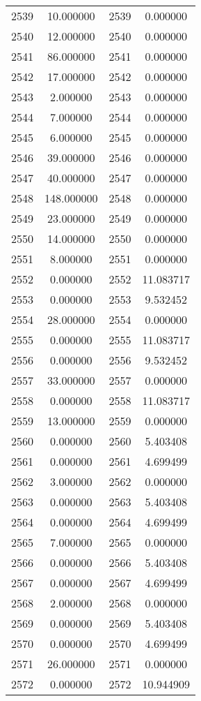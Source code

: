 \documentclass[12pt]{article}
\begin{document}
\begin{longtable}{@{}cccc@{}}
2539 & 10.000000 & 2539 & 0.000000 \\
2540 & 12.000000 & 2540 & 0.000000 \\
2541 & 86.000000 & 2541 & 0.000000 \\
2542 & 17.000000 & 2542 & 0.000000 \\
2543 & 2.000000 & 2543 & 0.000000 \\
2544 & 7.000000 & 2544 & 0.000000 \\
2545 & 6.000000 & 2545 & 0.000000 \\
2546 & 39.000000 & 2546 & 0.000000 \\
2547 & 40.000000 & 2547 & 0.000000 \\
2548 & 148.000000 & 2548 & 0.000000 \\
2549 & 23.000000 & 2549 & 0.000000 \\
2550 & 14.000000 & 2550 & 0.000000 \\
2551 & 8.000000 & 2551 & 0.000000 \\
2552 & 0.000000 & 2552 & 11.083717 \\
2553 & 0.000000 & 2553 & 9.532452 \\
2554 & 28.000000 & 2554 & 0.000000 \\
2555 & 0.000000 & 2555 & 11.083717 \\
2556 & 0.000000 & 2556 & 9.532452 \\
2557 & 33.000000 & 2557 & 0.000000 \\
2558 & 0.000000 & 2558 & 11.083717 \\
2559 & 13.000000 & 2559 & 0.000000 \\
2560 & 0.000000 & 2560 & 5.403408 \\
2561 & 0.000000 & 2561 & 4.699499 \\
2562 & 3.000000 & 2562 & 0.000000 \\
2563 & 0.000000 & 2563 & 5.403408 \\
2564 & 0.000000 & 2564 & 4.699499 \\
2565 & 7.000000 & 2565 & 0.000000 \\
2566 & 0.000000 & 2566 & 5.403408 \\
2567 & 0.000000 & 2567 & 4.699499 \\
2568 & 2.000000 & 2568 & 0.000000 \\
2569 & 0.000000 & 2569 & 5.403408 \\
2570 & 0.000000 & 2570 & 4.699499 \\
2571 & 26.000000 & 2571 & 0.000000 \\
2572 & 0.000000 & 2572 & 10.944909 \\

\end{longtable}
\end{document}
